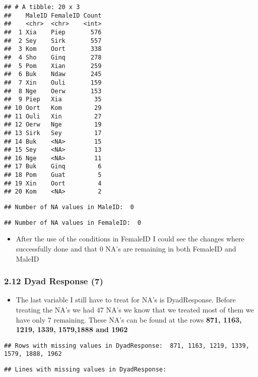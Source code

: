 \documentclass[
]{article}
\providecommand{\tightlist}{%
  \setlength{\itemsep}{0pt}\setlength{\parskip}{0pt}}
\begin{document}
\begin{verbatim}
## # A tibble: 20 x 3
##    MaleID FemaleID Count
##    <chr>  <chr>    <int>
##  1 Xia    Piep       576
##  2 Sey    Sirk       557
##  3 Kom    Oort       338
##  4 Sho    Ginq       278
##  5 Pom    Xian       259
##  6 Buk    Ndaw       245
##  7 Xin    Ouli       159
##  8 Nge    Oerw       153
##  9 Piep   Xia         35
## 10 Oort   Kom         29
## 11 Ouli   Xin         27
## 12 Oerw   Nge         19
## 13 Sirk   Sey         17
## 14 Buk    <NA>        15
## 15 Sey    <NA>        13
## 16 Nge    <NA>        11
## 17 Buk    Ginq         6
## 18 Pom    Guat         5
## 19 Xin    Oort         4
## 20 Kom    <NA>         2
\end{verbatim}

\begin{verbatim}
## Number of NA values in MaleID:  0
\end{verbatim}

\begin{verbatim}
## Number of NA values in FemaleID:  0
\end{verbatim}

\begin{itemize}
\tightlist
\item
  After the use of the conditions in FemaleID I could see the changes
  where successfully done and that 0 NA's are remaining in both FemaleID
  and MaleID
\end{itemize}

\hypertarget{dyad-response-7}{%
\subsubsection{2.12 Dyad Response (7)}\label{dyad-response-7}}

\begin{itemize}
\tightlist
\item
  The last variable I still have to treat for NA's is DyadResponse.
  Before treating the NA's we had 47 NA's we know that we treated most
  of them we have only 7 remaining. These NA's can be found at the rows
  \textbf{871, 1163, 1219, 1339, 1579,1888 and 1962}
\end{itemize}

\begin{verbatim}
## Rows with missing values in DyadResponse:  871, 1163, 1219, 1339, 1579, 1888, 1962
\end{verbatim}

\begin{verbatim}
## Lines with missing values in DyadResponse:
\end{verbatim}
\end{document}
